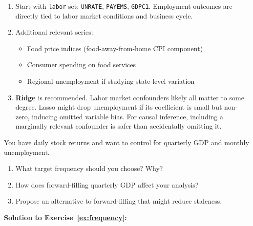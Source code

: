 \begin{enumerate}
    \item[(a)] Start with \texttt{labor} set: \texttt{UNRATE}, \texttt{PAYEMS}, \texttt{GDPC1}. Employment outcomes are directly tied to labor market conditions and business cycle.

    \item[(b)] Additional relevant series:
    \begin{itemize}
        \item Food price indices (food-away-from-home CPI component)
        \item Consumer spending on food services
        \item Regional unemployment if studying state-level variation
    \end{itemize}

    \item[(c)] \textbf{Ridge} is recommended. Labor market confounders likely all matter to some degree. Lasso might drop unemployment if its coefficient is small but non-zero, inducing omitted variable bias. For causal inference, including a marginally relevant confounder is safer than accidentally omitting it.
\end{enumerate}

\begin{exercise}
\label{ex:frequency}
You have daily stock returns and want to control for quarterly GDP and monthly unemployment.

\begin{enumerate}
    \item[(a)] What target frequency should you choose? Why?
    \item[(b)] How does forward-filling quarterly GDP affect your analysis?
    \item[(c)] Propose an alternative to forward-filling that might reduce staleness.
\end{enumerate}
\end{exercise}

\textbf{Solution to Exercise~\ref{ex:frequency}:}

